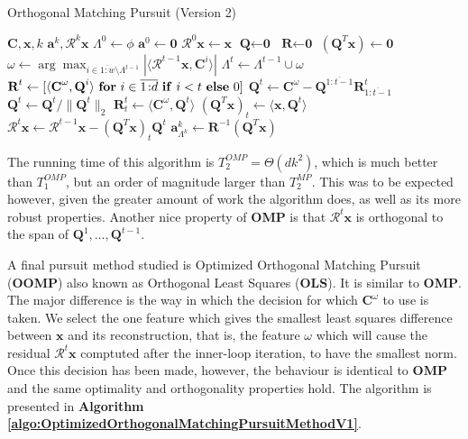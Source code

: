 \documentclass[12pt,a4paper,oneside,english]{UPBThesis}
\newcommand{\hcrange}[2]{\overline{{#1}\colon\!\!{#2}}}
\begin{document}
\begin{algorithm}
\caption{Orthogonal Matching Pursuit (Version 2)}
\label{algo:OrthogonalMatchingPursuitMethodV2}
\begin{algorithmic}
\Require $\textbf{C},\textbf{x},k$
\Ensure $\textbf{a}^k,\mathcal{R}^k\textbf{x}$
\State $\Lambda^0 \gets \phi$
\State $\textbf{a}^0 \gets \textbf{0}$
\State $\mathcal{R}^0\textbf{x} \gets \textbf{x}$
\State $\textbf{Q} \gets \textbf{0}$
\State $\textbf{R} \gets \textbf{0}$
\State $(\textbf{Q}^T\textbf{x}) \gets \textbf{0}$
\For {$t = \hcrange{1}{k}$}
\State $\omega \gets \arg \max_{i \in \hcrange{1}{w} \setminus \Lambda^{t-1}} \left| \langle \mathcal{R}^{t-1}\textbf{x} , \textbf{C}^i \rangle \right|$
\State $\Lambda^t \gets \Lambda^{t-1} \cup \omega$
\State $\textbf{R}^t \gets [ \langle \textbf{C}^\omega, \textbf{Q}^i \rangle~\mbox{\textbf{for} $i \in \hcrange{1}{d}$ \textbf{if} $i < t$ \textbf{else} $0$} ]$ 
\State $\textbf{Q}^t \gets \textbf{C}^\omega - \textbf{Q}^{\hcrange{1}{t-1}}\textbf{R}^t_{\hcrange{1}{t-1}}$ 
\State $\textbf{Q}^t \gets \textbf{Q}^t / \| \textbf{Q}^t \|_2$ 
\State $\textbf{R}^t_t \gets \langle \textbf{C}^\omega, \textbf{Q}^t \rangle$
\State $(\textbf{Q}^T\textbf{x})_t \gets \langle \textbf{x}, \textbf{Q}^t \rangle$
\State $\mathcal{R}^t\textbf{x} \gets \mathcal{R}^{t-1}\textbf{x} -  (\textbf{Q}^T\textbf{x})_t \textbf{Q}^t$
\EndFor
\State $\textbf{a}_{\Lambda^k}^k \gets \textbf{R}^{-1}(\textbf{Q}^T\textbf{x})$
\end{algorithmic}
\end{algorithm}

The running time of this algorithm is $T_2^{OMP} = \Theta(dk^2)$, which is much better than $T_1^{OMP}$, but an order of magnitude larger than $T_2^{MP}$. This was to be expected however, given the greater amount of work the algorithm does, as well as its more robust properties. Another nice property of \textbf{OMP} is that $\mathcal{R}^t\textbf{x}$ is orthogonal to the span of $\textbf{Q}^1,\dots,\textbf{Q}^{t-1}$.

A final pursuit method studied is Optimized Orthogonal Matching Pursuit (\textbf{OOMP}) \cite{optimizedorthopursuit,orthogonalls} also known as Orthogonal Least Squares (\textbf{OLS}). It is similar to \textbf{OMP}. The major difference is the way in which the decision for which $\textbf{C}^\omega$ to use is taken. We select the one feature which gives the smallest least squares difference between $\textbf{x}$ and its reconstruction, that is, the feature $\omega$ which will cause the residual $\mathcal{R}^t\textbf{x}$ comptuted after the inner-loop iteration, to have the smallest norm. Once this decision has been made, however, the behaviour is identical to $\textbf{OMP}$ and the same optimality and orthogonality properties hold. The algorithm is presented in \textbf{Algorithm \ref{algo:OptimizedOrthogonalMatchingPursuitMethodV1}}.
\end{document}
